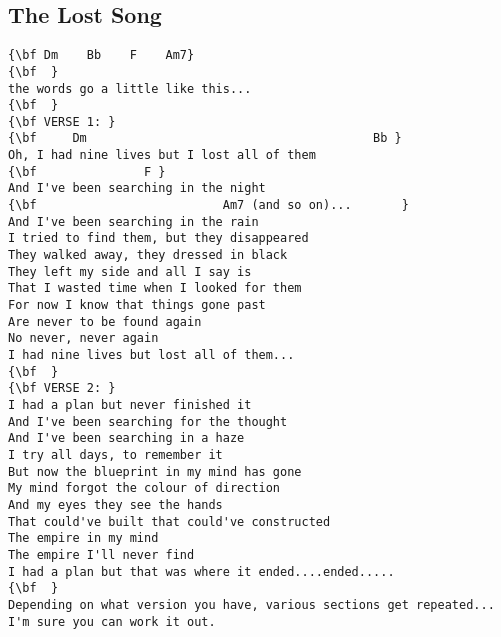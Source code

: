 \documentclass[a4paper]{article}
\begin{document}
\subsection{The Lost Song}
\begin{Verbatim}[commandchars=\\\{\}]
{\bf Dm    Bb    F    Am7}
{\bf  }
the words go a little like this... 
{\bf  }
{\bf VERSE 1: }
{\bf     Dm                                        Bb }
Oh, I had nine lives but I lost all of them 
{\bf               F }
And I've been searching in the night  
{\bf                          Am7 (and so on)...       }
And I've been searching in the rain 
I tried to find them, but they disappeared 
They walked away, they dressed in black 
They left my side and all I say is 
That I wasted time when I looked for them 
For now I know that things gone past  
Are never to be found again 
No never, never again 
I had nine lives but lost all of them... 
{\bf  }
{\bf VERSE 2: }
I had a plan but never finished it 
And I've been searching for the thought 
And I've been searching in a haze  
I try all days, to remember it 
But now the blueprint in my mind has gone 
My mind forgot the colour of direction 
And my eyes they see the hands 
That could've built that could've constructed 
The empire in my mind 
The empire I'll never find 
I had a plan but that was where it ended....ended..... 
{\bf  }
Depending on what version you have, various sections get repeated...
I'm sure you can work it out.

\end{Verbatim}
\newpage
\end{document}
